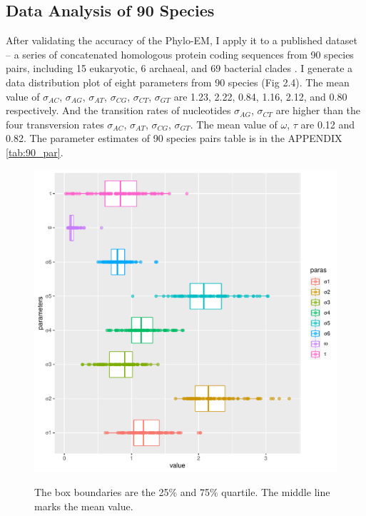 \subsection{Data Analysis of 90 Species}
After validating the accuracy of the Phylo-EM, I apply it to a published dataset -- a series of concatenated homologous protein coding sequences from 90 species pairs, including 15 eukaryotic, 6 archaeal, and 69 bacterial clades \parencite{zou2021nonsynonymous}. I generate a data distribution plot of eight parameters from 90 species (Fig 2.4). The mean value of $\sigma_{AC}$, $\sigma_{AG}$, $\sigma_{AT}$,  $\sigma_{CG}$, $\sigma_{CT}$, $\sigma_{GT}$ are 1.23, 2.22, 0.84, 1.16, 2.12, and 0.80 respectively. And the transition rates of nucleotides $\sigma_{AG}$, $\sigma_{CT}$ are higher than the four transversion rates $\sigma_{AC}$, $\sigma_{AT}$,  $\sigma_{CG}$, $\sigma_{GT}$. The mean value of $\omega$, $\tau$ are 0.12 and 0.82. The parameter estimates of 90 species pairs table is in the APPENDIX \ref{tab:90_par}. 
\begin{figure}[H]
     \begin{minipage}[t]{1\textwidth }
     \centering
     \includegraphics[width=\linewidth]{Fig4.pdf}
     {{The box boundaries are the 25$\%$ and 75$\%$ quartile. The middle line marks the mean value.}
       \par}
     \end{minipage}
\end{figure}
  

